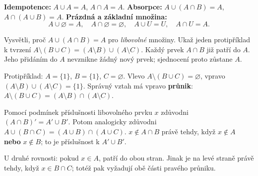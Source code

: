 \documentclass[11pt,a4paper]{article}
\begin{document}

\begin{vlastnostBox}[title={Věta - Idempotence a absorpce množinových operací}]
\textbf{Idempotence:} $A\cup A=A$, $A\cap A=A$.
\textbf{Absorpce:} $A\cup(A\cap B)=A$, $A\cap(A\cup B)=A$.
\textbf{Prázdná a základní množina:}
\[
A\cup\varnothing=A,\quad A\cap\varnothing=\varnothing,\quad
A\cup U=U,\quad A\cap U=A.
\]
\end{vlastnostBox}

\begin{prikladReseniBox}[title={Rozšíření 1}]
Vysvětli, proč $A\cup(A\cap B)=A$ pro \emph{libovolné} množiny.
Ukaž jeden protipříklad k tvrzení
$A\setminus(B\cup C)=(A\setminus B)\cup(A\setminus C)$.
\tcblower
Každý prvek $A\cap B$ již patří do $A$. Jeho přidáním do $A$
nevznikne žádný nový prvek; sjednocení proto zůstane $A$.

Protipříklad: $A=\{1\}$, $B=\{1\}$, $C=\varnothing$.
Vlevo $A\setminus(B\cup C)=\varnothing$,
vpravo $(A\setminus B)\cup(A\setminus C)=\{1\}$.
Správný vztah má vpravo \textbf{průnik}:
$A\setminus(B\cup C)=(A\setminus B)\cap(A\setminus C)$.
\end{prikladReseniBox}

\begin{prikladReseniBox}[title={Rozšíření 2}]
Pomocí podmínek příslušnosti libovolného prvku $x$ zdůvodni
$(A\cap B)'=A'\cup B'$. Potom analogicky zdůvodni
$A\cup(B\cap C)=(A\cup B)\cap(A\cup C)$.
\tcblower
$x\notin A\cap B$ právě tehdy, když $x\notin A$ \textbf{nebo}
$x\notin B$; to je příslušnost k $A'\cup B'$.

U druhé rovnosti: pokud $x\in A$, patří do obou stran.
Jinak je na levé straně právě tehdy, když $x\in B\cap C$;
totéž pak vyžadují obě části pravého průniku.
\end{prikladReseniBox}
\end{document}
